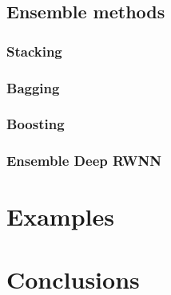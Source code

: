 \documentclass[
]{jss}
\begin{document}
\hypertarget{ensemble-methods}{%
\subsection{Ensemble methods}\label{ensemble-methods}}

\hypertarget{stacking}{%
\subsubsection{Stacking}\label{stacking}}

\hypertarget{bagging}{%
\subsubsection{Bagging}\label{bagging}}

\hypertarget{boosting}{%
\subsubsection{Boosting}\label{boosting}}

\hypertarget{ensemble-deep-rwnn}{%
\subsubsection{Ensemble Deep RWNN}\label{ensemble-deep-rwnn}}

\hypertarget{EX}{%
\section{Examples}\label{EX}}

\hypertarget{CON}{%
\section{Conclusions}\label{CON}}

\renewcommand\refname{References}

\end{document}
